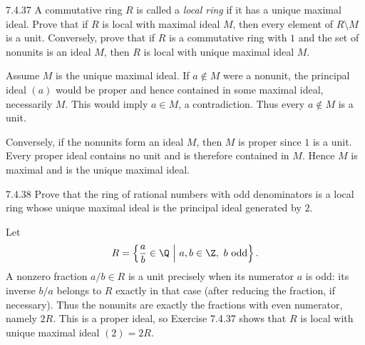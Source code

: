 \documentclass[11pt,oneside]{article}
\begin{document}
\begin{exercise}{7.4.37}
A commutative ring $R$ is called a \emph{local ring} if it has a unique maximal ideal. Prove that if $R$ is local with maximal ideal $M$, then every element of $R\setminus M$ is a unit. Conversely, prove that if $R$ is a commutative ring with $1$ and the set of nonunits is an ideal $M$, then $R$ is local with unique maximal ideal $M$.
\end{exercise}
\begin{solution}
Assume $M$ is the unique maximal ideal. If $a\notin M$ were a nonunit, the principal ideal $(a)$ would be proper and hence contained in some maximal ideal, necessarily $M$. This would imply $a\in M$, a contradiction. Thus every $a\notin M$ is a unit.

Conversely, if the nonunits form an ideal $M$, then $M$ is proper since $1$ is a unit. Every proper ideal contains no unit and is therefore contained in $M$. Hence $M$ is maximal and is the unique maximal ideal.
\end{solution}

\begin{exercise}{7.4.38}
Prove that the ring of rational numbers with odd denominators is a local ring whose unique maximal ideal is the principal ideal generated by $2$.
\end{exercise}
\begin{solution}
Let
\[
R=\left\{\frac ab\in\Q\ \middle|\ a,b\in\Z,\ b\text{ odd}\right\}.
\]
A nonzero fraction $a/b\in R$ is a unit precisely when its numerator $a$ is odd: its inverse $b/a$ belongs to $R$ exactly in that case (after reducing the fraction, if necessary). Thus the nonunits are exactly the fractions with even numerator, namely $2R$. This is a proper ideal, so Exercise 7.4.37 shows that $R$ is local with unique maximal ideal $(2)=2R$.
\end{solution}
\end{document}
